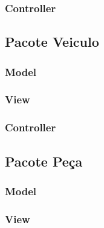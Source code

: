 \subsubsection{Controller}
%

\subsection{Pacote Veiculo}

\subsubsection{Model}


\subsubsection{View}



\subsubsection{Controller}
%

\subsection{Pacote Peça}

\subsubsection{Model}


\subsubsection{View}



